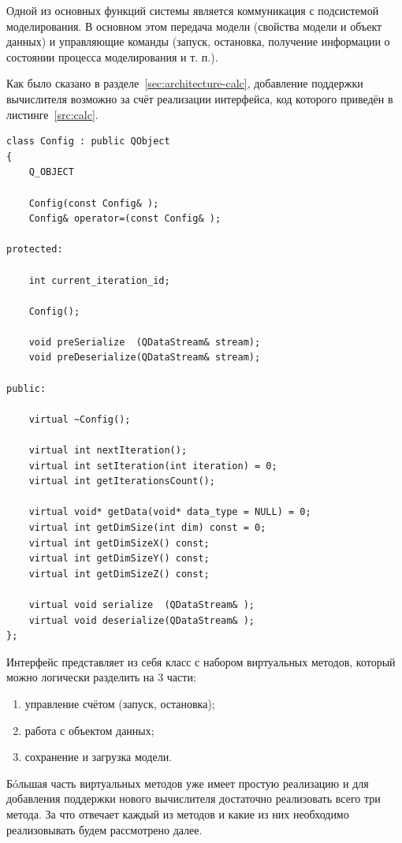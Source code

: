 \documentclass[a4paper,12pt]{extarticle}
\begin{document}
Одной из основных функций системы является коммуникация с подсистемой моделирования. В основном этом передача модели (свойства модели и объект данных) и управляющие команды (запуск, остановка, получение информации о состоянии процесса моделирования и т. п.).

Как было сказано в разделе~\ref{sec:architecture-calc}, добавление поддержки вычислителя возможно за счёт реализации интерфейса, код которого приведён в листинге~\ref{src:calc}.

\begin{lstlisting}[label=src:calc,title=Листинг Б.1 --- Интерфейс подключения вычислителя]
class Config : public QObject
{
    Q_OBJECT

    Config(const Config& );
    Config& operator=(const Config& );

protected:

    int current_iteration_id;

    Config();

    void preSerialize  (QDataStream& stream);
    void preDeserialize(QDataStream& stream);

public:

    virtual ~Config();

    virtual int nextIteration();
    virtual int setIteration(int iteration) = 0;
    virtual int getIterationsCount();

    virtual void* getData(void* data_type = NULL) = 0;
    virtual int getDimSize(int dim) const = 0;
    virtual int getDimSizeX() const;
    virtual int getDimSizeY() const;
    virtual int getDimSizeZ() const;

    virtual void serialize  (QDataStream& );
    virtual void deserialize(QDataStream& );
};
\end{lstlisting}

Интерфейс представляет из себя класс с набором виртуальных методов, который можно логически разделить на 3 части:
\begin{enumerate}
    \item управление счётом (запуск, остановка);
    \item работа с объектом данных;
    \item сохранение и загрузка модели.
\end{enumerate}

Б\'oльшая часть виртуальных методов уже имеет простую реализацию и для добавления поддержки нового вычислителя достаточно реализовать всего три метода. За что отвечает каждый из методов и какие из них необходимо реализовывать будем рассмотрено далее.
\end{document}
